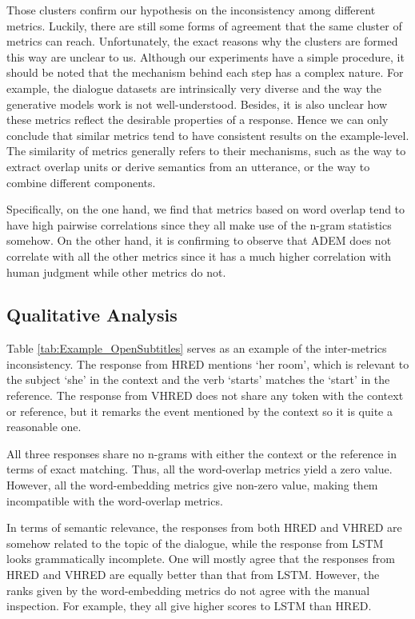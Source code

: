 \documentclass[conference]{IEEEtran}
\begin{document}
Those clusters confirm our hypothesis on the inconsistency among different metrics. Luckily, there are still some forms of agreement that the same cluster of metrics can reach. Unfortunately, the exact reasons why the clusters are formed this way are unclear to us. Although our experiments have a simple procedure, it should be noted that the mechanism behind each step has a complex nature. For example, the dialogue datasets are intrinsically very diverse and the way the generative models work is not well-understood. Besides, it is also unclear how these metrics reflect the desirable properties of a response. Hence we can only conclude that similar metrics tend to have consistent results on the example-level. The similarity of metrics generally refers to their mechanisms, such as the way to extract overlap units or derive semantics from an utterance, or the way to combine different components.

Specifically, on the one hand, we find that metrics based on word overlap tend to have high pairwise correlations since they all make use of the n-gram statistics somehow. On the other hand, it is confirming to observe that ADEM does not correlate with all the other metrics since it has a much higher correlation with human judgment while other metrics do not.

\subsection{Qualitative Analysis}

Table \ref{tab:Example_OpenSubtitles} serves as an example of the inter-metrics inconsistency. The response from HRED mentions `her room', which is relevant to the subject `she' in the context and the verb `starts' matches the `start' in the reference. The response from VHRED does not share any token with the context or reference, but it remarks the event mentioned by the context so it is quite a reasonable one.

All three responses share no n-grams with either the context or the reference in terms of exact matching. Thus, all the word-overlap metrics yield a zero value. However, all the word-embedding metrics give non-zero value, making them incompatible with the word-overlap metrics.

In terms of semantic relevance, the responses from both HRED and VHRED are somehow related to the topic of the dialogue, while the response from LSTM looks grammatically incomplete. One will mostly agree that the responses from HRED and VHRED are equally better than that from LSTM. However, the ranks given by the word-embedding metrics do not agree with the manual inspection. For example, they all give higher scores to LSTM than HRED.
\end{document}
